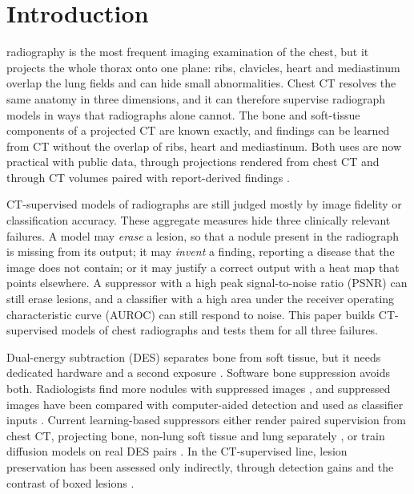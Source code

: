 \section{Introduction}
\label{sec:intro}
 radiography is the most frequent imaging examination of the chest, but it projects the whole thorax onto one
plane: ribs, clavicles, heart and mediastinum overlap the lung fields and can hide small abnormalities. Chest CT resolves the same
anatomy in three dimensions, and it can therefore supervise radiograph models in ways that radiographs alone cannot. The bone and
soft-tissue components of a projected CT are known exactly, and findings can be learned from CT without the overlap of ribs, heart and
mediastinum. Both uses are now practical with public data, through projections rendered from chest CT \cite{angaitkar2026anatomy} and
through CT volumes paired with report-derived findings \cite{hamamci2026ctrate}.

CT-supervised models of radiographs are still judged mostly by image fidelity or classification accuracy. These aggregate measures hide
three clinically relevant failures. A model may \emph{erase} a lesion, so that a nodule present in the radiograph is missing from its
output; it may \emph{invent} a finding, reporting a disease that the image does not contain; or it may justify a correct output with a
heat map that points elsewhere. A suppressor with a high peak signal-to-noise ratio (PSNR) can still erase lesions, and a classifier with
a high area under the receiver operating characteristic curve (AUROC) can still respond to noise. This paper builds CT-supervised models
of chest radiographs and tests them for all three failures.

Dual-energy subtraction (DES) separates bone from soft tissue, but it needs dedicated hardware and a second exposure
\cite{kuhlman2006des,sun2026bsldm}. Software bone suppression avoids both. Radiologists find more nodules with suppressed images
\cite{freedman2011lung}, and suppressed images have been compared with computer-aided detection \cite{schalekamp2014cad} and used as
classifier inputs \cite{rajaraman2021bone}. Current learning-based suppressors either render paired supervision from chest CT, projecting
bone, non-lung soft tissue and lung separately \cite{angaitkar2026anatomy}, or train diffusion models on real DES pairs
\cite{chen2024bsdiff,sun2026bsldm,sun2025gllcm,sun2026debonedit}. In the CT-supervised line, lesion preservation has been assessed only
indirectly, through detection gains and the contrast of boxed lesions \cite{angaitkar2026anatomy}.

